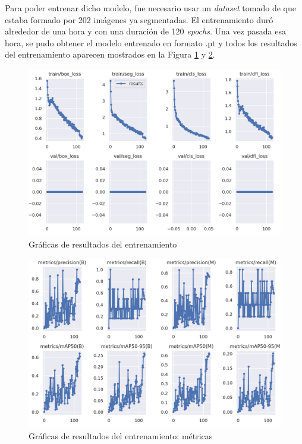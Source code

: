 Para poder entrenar dicho modelo, fue necesario usar un \textit{dataset} tomado de \cite{pothole-detection-project-new_dataset} que estaba formado por 202 imágenes ya segmentadas. El entrenamiento duró alrededor de una hora y con una duración de 120 \textit{epochs}. Una vez pasada esa hora, se pudo obtener el modelo entrenado en formato .pt y todos los resultados del entrenamiento aparecen mostrados en la Figura \ref{fig:iares} y \ref{fig:iares2}.

 \begin{figure} [h!]
	\begin{center}
		\includegraphics[width=13cm]{figs/cap6/results.png}
	\end{center}
	\caption{Gráficas de resultados del entrenamiento}
	\label{fig:iares}
\end{figure}


 \begin{figure} [h!]
	\begin{center}
		\includegraphics[width=14cm]{figs/cap6/results1.png}
	\end{center}
	\caption{Gráficas de resultados del entrenamiento: métricas}
	\label{fig:iares2}
\end{figure}

